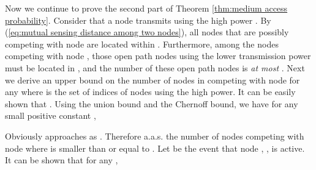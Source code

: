 \documentclass[english]{IEEEtran}
\theoremstyle{plain}
\theoremstyle{plain}
\theoremstyle{plain}
\theoremstyle{remark}
\begin{document}
Now we continue to prove the second part of Theorem \ref{thm:medium access probability}.
Consider that a node  transmits using the high power .
By (\ref{eq:mutual sensing distance among two nodes}), all nodes
that are possibly competing with node  are located within .
Furthermore, among the nodes competing with node , those open
path nodes using the lower transmission power  must be located
in ,
and the number of these open path nodes is \emph{at most} .
Next we derive an upper bound on the number of nodes in 
competing with node  for any  where 
is the set of indices of nodes using the high power. It can be easily
shown that .
Using the union bound and the Chernoff bound, we have for any small
positive constant ,

Obviously 
approaches  as . Therefore a.a.s. the number
of nodes competing with node  where  is smaller
than or equal to .
Let  be the event that node , ,
is active. It can be shown that for any ,

 
\end{document}
